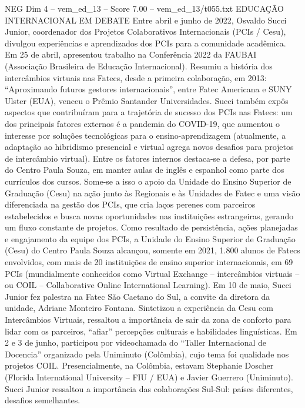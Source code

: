 \begin{textsample}{NEG Dim 4 – vem\_ed\_13 – Score 7.00 – vem\_ed\_13/t055.txt}  \label{ex:f4_neg_146}
EDUCAÇÃO INTERNACIONAL EM DEBATE Entre abril e junho de 2022, Osvaldo Succi Junior, coordenador dos Projetos Colaborativos Internacionais (PCIs / Cesu), divulgou experiências e aprendizados dos PCIs para a comunidade acadêmica.
Em 25 de abril, apresentou trabalho na Conferência 2022 da FAUBAI (Associação Brasileira de Educação Internacional).
Resumiu a história dos intercâmbios virtuais nas Fatecs, desde a primeira colaboração, em 2013: “Aproximando futuros gestores internacionais”, entre Fatec Americana e SUNY Ulster (EUA), venceu o Prêmio Santander Universidades.
Succi também expôs aspectos que contribuíram para a trajetória de sucesso dos PCIs nas Fatecs: um dos principais fatores externos é a pandemia do COVID-19, que aumentou o interesse por soluções tecnológicas para o ensino-aprendizagem (atualmente, a adaptação ao hibridismo presencial e virtual agrega novos desafios para projetos de intercâmbio virtual).
Entre os fatores internos destaca-se a defesa, por parte do Centro Paula Souza, em manter aulas de inglês e espanhol como parte dos currículos dos cursos.
Some-se a isso o apoio da Unidade do Ensino Superior de Graduação (Cesu) na ação junto às Regionais e às Unidades de Fatec e uma visão diferenciada na gestão dos PCIs, que cria laços perenes com parceiros estabelecidos e busca novas oportunidades nas instituições estrangeiras, gerando um fluxo constante de projetos.
Como resultado de persistência, ações planejadas e engajamento da equipe dos PCIs, a Unidade do Ensino Superior de Graduação (Cesu) do Centro Paula Souza alcançou, somente em 2021, 1.800 alunos de Fatecs envolvidos, com mais de 20 instituições de ensino superior internacionais, em 69 PCIs (mundialmente conhecidos como Virtual Exchange – intercâmbios virtuais – ou COIL – Collaborative Online International Learning).
Em 10 de maio, Succi Junior fez palestra na Fatec São Caetano do Sul, a convite da diretora da unidade, Adriane Monteiro Fontana.
Sintetizou a experiência da Cesu com Intercâmbios Virtuais, ressaltou a importância de sair da zona de conforto para lidar com os parceiros, “afiar” percepções culturais e habilidades linguísticas.
Em 2 e 3 de junho, participou por videochamada do “Taller Internacional de Docencia” organizado pela Uniminuto (Colômbia), cujo tema foi qualidade nos projetos COIL.
Presencialmente, na Colômbia, estavam Stephanie Doscher (Florida International University – FIU / EUA) e Javier Guerrero (Uniminuto).
Succi Junior ressaltou a importância das colaborações Sul-Sul: países diferentes, desafios semelhantes.

\end{textsample}
